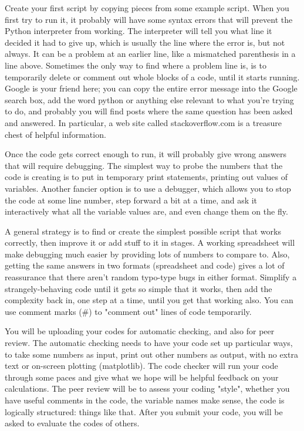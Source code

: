 Create your first script by copying pieces from some example script. When you first try to run it, it probably will have some syntax errors that will prevent the Python interpreter from working. The interpreter will tell you what line it decided it had to give up, which is usually the line where the error is, but not always. It can be a problem at an earlier line, like a mismatched parenthesis in a line above. Sometimes the only way to find where a problem line is, is to temporarily delete or comment out whole blocks of a code, until it starts running. Google is your friend here; you can copy the entire error message into the Google search box, add the word python or anything else relevant to what you’re trying to do, and probably you will find posts where the same question has been asked and answered. In particular, a web site called stackoverflow.com is a treasure chest of helpful information.

Once the code gets correct enough to run, it will probably give wrong answers that will require debugging. The simplest way to probe the numbers that the code is creating is to put in temporary print statements, printing out values of variables. Another fancier option is to use a debugger, which allows you to stop the code at some line number, step forward a bit at a time, and ask it interactively what all the variable values are, and even change them on the fly.

A general strategy is to find or create the simplest possible script that works correctly, then improve it or add stuff to it in stages. A working spreadsheet will make debugging much easier by providing lots of numbers to compare to. Also, getting the same answers in two formats (spreadsheet and code) gives a lot of reassurance that there aren't random typo-type bugs in either format. Simplify a strangely-behaving code until it gets so simple that it works, then add the complexity back in, one step at a time, until you get that working also. You can use comment marks (#) to "comment out" lines of code temporarily.

You will be uploading your codes for automatic checking, and also for peer review. The automatic checking needs to have your code set up particular ways, to take some numbers as input, print out other numbers as output, with no extra text or on-screen plotting (matplotlib). The code checker will run your code through some paces and give what we hope will be helpful feedback on your calculations. The peer review will be to assess your coding "style", whether you have useful comments in the code, the variable names make sense, the code is logically structured: things like that. After you submit your code, you will be asked to evaluate the codes of others.




